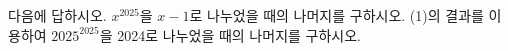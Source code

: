 다음에 답하시오.
 $x^{2025}$을 $x-1$로 나누었을 때의 나머지를 구하시오.
 (1)의 결과를 이용하여 $2025^{2025}$을 2024로 나누었을 때의 나머지를 구하시오.
